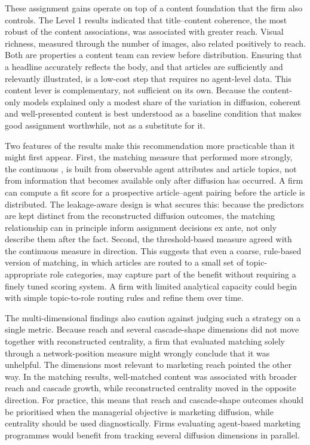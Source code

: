 These assignment gains operate on top of a content foundation that the firm also controls. The Level 1 results indicated that title–content coherence, the most robust of the content associations, was associated with greater reach. Visual richness, measured through the number of images, also related positively to reach. Both are properties a content team can review before distribution. Ensuring that a headline accurately reflects the body, and that articles are sufficiently and relevantly illustrated, is a low-cost step that requires no agent-level data. This content lever is complementary, not sufficient on its own. Because the content-only models explained only a modest share of the variation in diffusion, coherent and well-presented content is best understood as a baseline condition that makes good assignment worthwhile, not as a substitute for it.

Two features of the results make this recommendation more practicable than it might first appear. First, the matching measure that performed more strongly, the continuous , is built from observable agent attributes and article topics, not from information that becomes available only after diffusion has occurred. A firm can compute a fit score for a prospective article–agent pairing before the article is distributed. The leakage-aware design is what secures this: because the predictors are kept distinct from the reconstructed diffusion outcomes, the matching relationship can in principle inform assignment decisions ex ante, not only describe them after the fact. Second, the threshold-based  measure agreed with the continuous measure in direction. This suggests that even a coarse, rule-based version of matching, in which articles are routed to a small set of topic-appropriate role categories, may capture part of the benefit without requiring a finely tuned scoring system. A firm with limited analytical capacity could begin with simple topic-to-role routing rules and refine them over time.

The multi-dimensional findings also caution against judging such a strategy on a single metric. Because reach and several cascade-shape dimensions did not move together with reconstructed centrality, a firm that evaluated matching solely through a network-position measure might wrongly conclude that it was unhelpful. The dimensions most relevant to marketing reach pointed the other way. In the matching results, well-matched content was associated with broader reach and cascade growth, while reconstructed centrality moved in the opposite direction. For practice, this means that reach and cascade-shape outcomes should be prioritised when the managerial objective is marketing diffusion, while centrality should be used diagnostically. Firms evaluating agent-based marketing programmes would benefit from tracking several diffusion dimensions in parallel.

